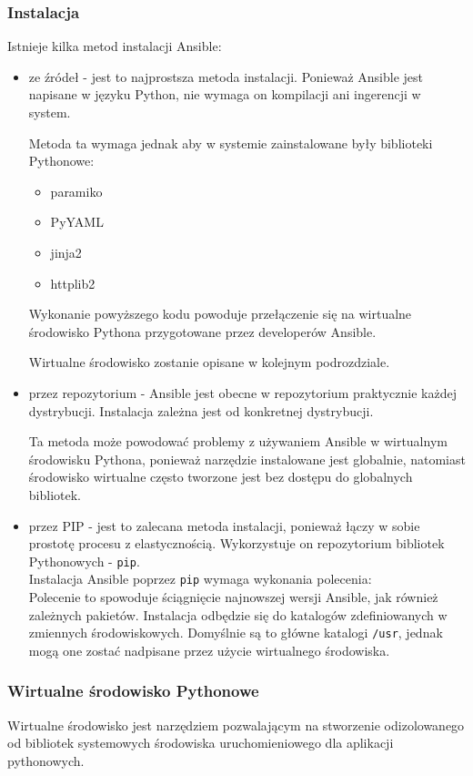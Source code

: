 \subsubsection{Instalacja}
Istnieje kilka metod instalacji Ansible:
\begin{itemize}
\item ze źródeł - jest to najprostsza metoda instalacji. Ponieważ Ansible jest napisane w języku Python, nie wymaga on kompilacji ani ingerencji w system.


Metoda ta wymaga jednak aby w systemie zainstalowane były biblioteki Pythonowe:
\begin{itemize}
\item paramiko
\item PyYAML
\item jinja2
\item httplib2
\end{itemize}
Wykonanie powyższego kodu powoduje przełączenie się na wirtualne środowisko Pythona przygotowane przez developerów Ansible.

Wirtualne środowisko zostanie opisane w kolejnym podrozdziale.
\item przez repozytorium - Ansible jest obecne w repozytorium praktycznie każdej dystrybucji. Instalacja zależna jest od konkretnej dystrybucji.

Ta metoda może powodować problemy z używaniem Ansible w wirtualnym środowisku Pythona, ponieważ narzędzie instalowane jest globalnie, natomiast środowisko wirtualne często tworzone jest bez dostępu do globalnych bibliotek.
\item przez PIP - jest to zalecana metoda instalacji, ponieważ łączy w sobie prostotę procesu z elastycznością.
Wykorzystuje on repozytorium bibliotek Pythonowych - \texttt{pip}.\\
Instalacja Ansible poprzez \texttt{pip} wymaga wykonania polecenia:\\

Polecenie to spowoduje ściągnięcie najnowszej wersji Ansible, jak również zależnych pakietów.
Instalacja odbędzie się do katalogów zdefiniowanych w zmiennych środowiskowych. Domyślnie są to główne katalogi \texttt{/usr}, jednak mogą one zostać nadpisane przez użycie wirtualnego środowiska.
\end{itemize}
\subsubsection{Wirtualne środowisko Pythonowe}
Wirtualne środowisko jest narzędziem pozwalającym na stworzenie odizolowanego od bibliotek systemowych środowiska uruchomieniowego dla aplikacji pythonowych.

